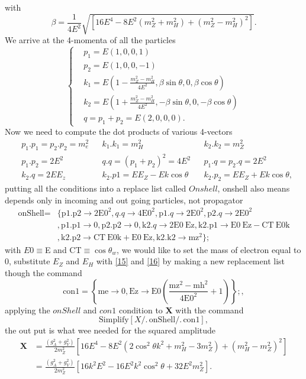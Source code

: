 \documentclass{report}
\numberwithin{equation}{section}
\begin{document}
with
\begin{equation}
\beta=\frac{1}{4E^2}\sqrt{\left[16E^4-8E^2(m_Z^2+m_H^2)+(m_Z^2-m_H^2)^2\right]}.
\end{equation}
We arrive at the 4-momenta of all the particles
\begin{equation}
\begin{cases}
&p_1=E(1,0,0,1)\\
&p_2=E(1,0,0,-1)\\
&k_1=E\left(1-\frac{m_Z^2-m_H^2}{4E^2},\beta \sin\theta,0,\beta \cos\theta\right)\\
&k_2=E\left(1+\frac{m_Z^2-m_H^2}{4E^2},-\beta \sin\theta,0,-\beta \cos\theta\right)\\
&q=p_1+p_2=E(2,0,0,0).
\end{cases}
\end{equation}
	Now we need to compute the dot products of various 4-vectors
\begin{align*}
&p_1.p_1=p_2.p_2=m_e^2 & &k_1.k_1=m_H^2 & &k_2.k_2=m_Z^2\\
&p_1.p_2=2E^2	 &	&q.q=(p_1+p_2)^2=4E^2 &  &p_1.q=p_2.q=2E^2	\\
&k_2.q =2EE_z & &k_2.p1=EE_Z-Ek\cos\theta &&k_2.p_2=EE_Z+Ek\cos\theta,
\end{align*}
putting all the conditions into a replace list called $Onshell$, onshell also means depends only in incoming and out going particles, not propagator
\begin{align*}
\text{onShell}=&\{\text{p1}.\text{p2}\to 2 \text{E0}^2,q.q\to 4 \text{E0}^2,\text{p1}.q\to 2 \text{E0}^2,\text{p2}.q\to 2 \text{E0}^2\\
&,\text{p1}.\text{p1}\to 0,\text{p2}.\text{p2}\to 0,\text{k2}.q\to 2 \text{E0}\ \text{Ez},\text{k2}.\text{p1}\to \text{E0}\ \text{Ez}-\text{CT}\ \text{E0} \text{k}\\
&,\text{k2}.\text{p2}\to \text{CT}\ \text{E0} \text{k}+\text{E0}\ \text{Ez},\text{k2}.\text{k2}\to \text{mz}^2\};
\end{align*}
with $E0 \equiv $E and CT$ \equiv \cos\theta_w$,
we would like to set the mass of electron equal to 0, substitute $E_Z$ and $E_H$ with \eqref{15} and \eqref{16} by making a new replacement list though the command
\begin{equation}
\text{con1}=\left\{\text{me}\to 0,\text{Ez}\to \text{E0} \left(\frac{\text{mz}^2-\text{mh}^2}{4 \text{E0}^2}+1\right)\right\};,
\end{equation}
applying the $onShell$ and $con1$ condition to \textbf{X} with the command
\begin{equation}
\text{Simplify}[X\text{/.}\, \text{onShell}\text{/.}\, \text{con1}],
\end{equation}
the out put is what wee needed for the squared amplitude
\begin{equation}
\begin{split}
\textbf{X}&=\frac{(g_A^2+g_V^2)}{2 m_Z^2} [16 E^4-8 E^2 (2 \cos^2\theta k^2+m_H^2-3 m_Z^2)+(m_H^2-m_Z^2)^2]\\
&=\frac{(g_A^2+g_V^2)}{2 m_Z^2}\left[16k^2E^2-16E^2k^2\cos^2\theta+32E^2 m_Z^2\right] .
\end{split}
\end{equation}
\end{document}
